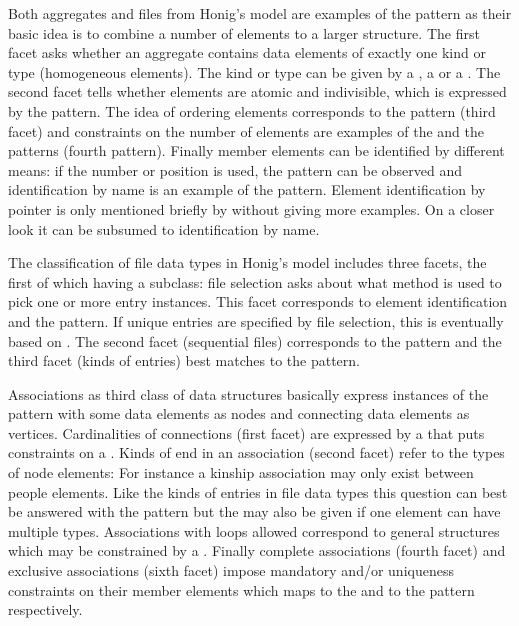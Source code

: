 Both aggregates and files from Honig's model are examples of the
 pattern as their basic idea is to combine a number of
elements to a larger structure. The first facet asks whether an aggregate
contains data elements of exactly one kind or type (homogeneous elements). The
kind or type can be given by a , a  or a
. The second facet tells whether elements are atomic and
indivisible, which is expressed by the  pattern. The idea of
ordering elements corresponds to the  pattern (third facet)
and constraints on the number of elements are examples of the 
and the  patterns (fourth pattern). Finally member elements can
be identified by different means: if the number or position is used, the
 pattern can be observed and identification by name is an
example of the  pattern. Element identification by pointer
is only mentioned briefly by \textcite[p. 146]{Honig1975} without giving more
examples. On a closer look it can be subsumed to identification by name.

The classification of file data types in Honig's model includes three facets,
the first of which having a subclass: file selection asks about what method is
used to pick one or more entry instances. This facet corresponds to element
identification and the  pattern. If unique entries are
specified by file selection, this is eventually based on
. The second facet (sequential files) corresponds to the
 pattern and the third facet (kinds of entries) best matches
to the  pattern.

Associations as third class of data structures basically express instances of
the  pattern with some data elements as nodes and connecting
data elements as vertices. Cardinalities of connections (first facet) are
expressed by a  that puts constraints on a .
Kinds of end in an association (second facet) refer to the types of node
elements: For instance a kinship association may only exist between people
elements. Like the kinds of entries in file data types this question
can best be answered with the  pattern but the
 may also be given if one element can have multiple types.
Associations with loops allowed correspond to general 
structures which may be constrained by a . Finally complete
associations (fourth facet) and exclusive associations (sixth facet) impose
mandatory and/or uniqueness constraints on their member elements which 
maps to the  and to the  pattern respectively.


